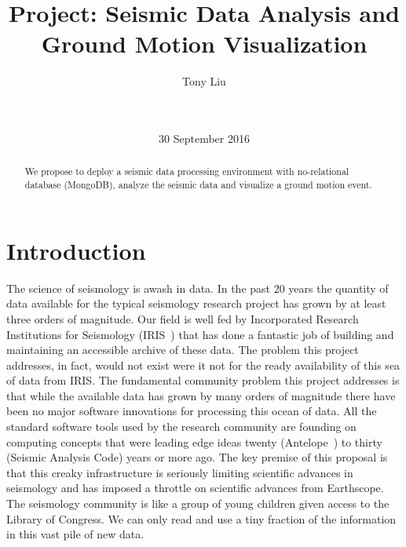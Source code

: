 \documentclass{acm_proc_article-sp}
\begin{document}
\title{Project: Seismic Data Analysis and Ground Motion Visualization}

\author{
\alignauthor
Tony Liu\\
       \\
       \\
}

\date{30 September 2016}


\maketitle
\begin{abstract}
We propose to deploy a seismic data processing environment with no-relational database (MongoDB), analyze the seismic data and visualize a ground motion event.
\end{abstract}


\section{Introduction}

The science of seismology is awash in data. In the past 20 years the quantity of data available for the typical seismology research project has grown by at least three orders of magnitude.  Our field is well fed by Incorporated Research Institutions for Seismology (IRIS~\cite{IRIS}) that has done a fantastic job of building and maintaining an accessible archive of these data.  The problem this project addresses, in fact, would not exist were it not for the ready availability of this sea of data from IRIS.  The fundamental community problem this project addresses is that while the available data has grown by many orders of magnitude there have been no major software innovations for processing this ocean of data.  All the standard software tools used by the research community are founding on computing concepts that were leading edge ideas twenty (Antelope~\cite{Antelope}) to thirty (Seismic Analysis Code) years or more ago.  The key premise of this proposal is that this creaky infrastructure is seriously limiting scientific advances in seismology and has imposed a throttle on scientific advances from Earthscope.  The seismology community is like a group of young children given access to the Library of Congress.  We can only read and use a tiny fraction of the information in this vast pile of new data.  
\end{document}
